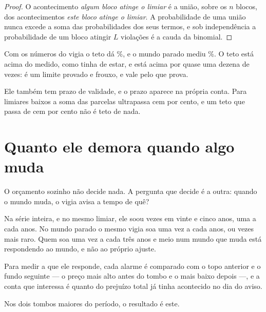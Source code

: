 \begin{proof}
O acontecimento \emph{algum bloco atinge o limiar} é a união, sobre os $n$ blocos, dos
acontecimentos \emph{este bloco atinge o limiar}. A probabilidade de uma união nunca excede a
soma das probabilidades dos seus termos, e sob independência a probabilidade de um bloco
atingir $L$ violações é a cauda da binomial.
\end{proof}

Com os números do vigia o teto dá \numVigiaTetoIndependentePct\%, e o mundo parado
mediu \numVigiaMundosQueSoamPct\%. O teto está acima do medido, como tinha de estar, e está
acima por quase uma dezena de vezes: é um limite provado e frouxo, e vale pelo que prova.

Ele também tem prazo de validade, e o prazo aparece na própria conta. Para limiares baixos a
soma das parcelas ultrapassa cem por cento, e um teto que passa de cem por cento não é teto de
nada.

\section{Quanto ele demora quando algo muda}

O orçamento sozinho não decide nada. A pergunta que decide é a outra: quando o mundo muda, o
vigia avisa a tempo de quê?

Na série inteira, e no mesmo limiar, ele soou \numVigiaAlarmesReais{} vezes em vinte e cinco
anos, uma a cada \numVigiaAnosReaisPorAlarme{} anos. No mundo parado o mesmo vigia soa uma vez
a cada \numVigiaAnosParadoPorAlarme{} anos, ou \numVigiaRazaoRealContraParado{} vezes mais
raro. Quem soa uma vez a cada três anos e meio num mundo que muda está respondendo ao mundo, e
não ao próprio ajuste.

Para medir a que ele responde, cada alarme é comparado com o topo anterior e o fundo seguinte
--- o preço mais alto antes do tombo e o mais baixo depois ---, e a conta que interessa é
quanto do prejuízo total já tinha acontecido no dia do aviso.

Nos dois tombos maiores do período, o resultado é este.

\begin{table}[htbp]
  \centering
  \caption{Os dois piores tombos do período, com o dia do alarme e a fração do prejuízo total
    que já tinha acontecido quando ele soou. No tombo mais recente, o alarme veio com
    \numVigiaTomboRecenteQuedaPct\% de queda já realizada, de um total de
    \numVigiaTomboRecenteTotalPct\%.}
  \label{tab:atraso}
\end{table}

